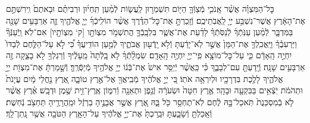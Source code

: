 \documentclass[twoside, openany, parskip=half, 11pt]{book}
\begin{document}
\begin{footnotesize}
\begin{multicols}{2}
כׇּל־הַמִּצְוָ֗ה אֲשֶׁ֨ר אָֽנֹכִ֧י מְֿצַוְּֿךָ֛ הַיּ֖וֹם תִּשְׁמְר֣וּן לַֽעֲשׂ֑וֹת לְֿמַ֨עַן תִּֽחְי֜וּן וּרְבִיתֶ֗ם וּבָאתֶם֙ וִֽירִשְׁתֶּ֣ם אֶת־הָאָ֔רֶץ אֲשֶׁר־נִשְׁבַּ֥ע יְיָ֖ לַֽאֲבֹֽתֵיכֶֽם׃ וְֿזָֽכַרְתָּ֣ אֶת־כׇּל־הַדֶּ֗רֶךְ אֲשֶׁ֨ר הוֹלִֽיכְֿךָ֜ יְיָ֧ אֱלֹהֶ֛יךָ זֶ֛ה אַרְבָּעִ֥ים שָׁנָ֖ה בַּמִּדְבָּ֑ר לְֿמַ֨עַן עַנֹּֽתְֿךָ֜ לְֿנַסֹּֽתְֿךָ֗ לָדַ֜עַת אֶת־אֲשֶׁ֧ר בִּלְבָֽבְֿךָ֛ הֲתִשְׁמֹ֥ר מִצְוֹתָ֖ו [ק‘ מִצְוֹתָ֖יו] אִם־לֹֽא׃ וַֽיְֿעַנְּֿךָ֘ וַיַּרְעִבֶ֒ךָ֒ וַיַּֽאֲכִֽלְךָ֤ אֶת־הַמָּן֙ אֲשֶׁ֣ר לֹֽא־יָדַ֔עְתָּ וְֿלֹ֥א יָֽדְֿע֖וּן אֲבֹתֶ֑יךָ לְֿמַ֣עַן הוֹדִֽיעֲךָ֗ כִּ֠י לֹ֣א עַל־הַלֶּ֤חֶם לְֿבַדּוֹ֙ יִחְיֶ֣ה הָֽאָדָ֔ם כִּ֛י עַל־כׇּל־מוֹצָ֥א פִֽי־יְיָ֖ יִחְיֶ֥ה הָֽאָדָֽם׃  שִׂמְלָ֨תְֿךָ֜ לֹ֤א בָֽלְֿתָה֙ מֵֽעָלֶ֔יךָ וְֿרַגְלְךָ֖ לֹ֣א בָצֵ֑קָה זֶ֖ה אַרְבָּעִ֥ים שָׁנָֽה׃ וְֿיָֽדַעְתָּ֖ עִם־לְבָבֶ֑ךָ כִּ֗י כַּֽאֲשֶׁ֨ר יְֿיַסֵּ֥ר אִישׁ֙ אֶת־בְּֿנ֔וֹ יְיָ֥ אֱלֹהֶ֖יךָ מְֿיַסְּֿרֶֽךָּ׃ וְֿשָׁ֣מַרְתָּ֔ אֶת־מִצְוֹ֖ת יְיָ֣ אֱלֹהֶ֑יךָ לָלֶ֥כֶת בִּדְרָכָ֖יו וּלְיִרְאָ֥ה אֹתֽוֹ׃ כִּ֚י יְיָ֣ אֱלֹהֶ֔יךָ מְֿבִֽיאֲךָ֖ אֶל־אֶ֣רֶץ טוֹבָ֑ה אֶ֚רֶץ נַ֣חֲלֵי מָ֔יִם עֲיָנֹת֙ וּתְהֹמֹ֔ת יֹֽצְֿאִ֥ים בַּבִּקְעָ֖ה וּבָהָֽר׃ אֶ֤רֶץ חִטָּה֙ וּשְׂעֹרָ֔ה וְֿגֶ֥פֶן וּתְאֵנָ֖ה וְֿרִמּ֑וֹן אֶֽרֶץ־זֵ֥ית שֶׁ֖מֶן וּדְבָֽשׁ׃ אֶ֗רֶץ אֲשֶׁ֨ר לֹ֤א בְֿמִסְכֵּנֻת֙ תֹּֽאכַל־בָּ֣הּ לֶ֔חֶם לֹֽא־תֶחְסַ֥ר כֹּ֖ל בָּ֑הּ אֶ֚רֶץ אֲשֶׁ֣ר אֲבָנֶ֣יהָ בַרְזֶ֔ל וּמֵֽהֲרָרֶ֖יהָ תַּחְצֹ֥ב נְֿחֽשֶׁת׃ וְֿאָֽכַלְתָּ֖ וְֿשָׂבָ֑עְתָּ וּבֵֽרַכְתָּ֙ אֶת־יְיָ֣ אֱלֹהֶ֔יךָ עַל־הָאָ֥רֶץ הַטֹּבָ֖ה אֲשֶׁ֥ר נָֽתַן־לָֽךְ׃


\end{multicols}
\end{footnotesize}
\end{document}
